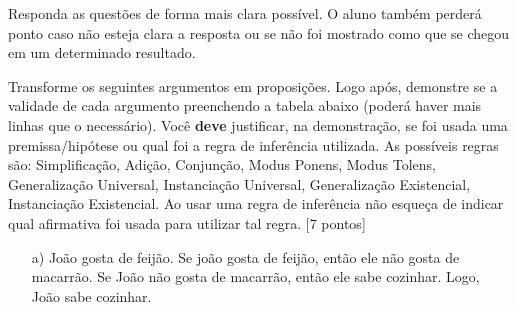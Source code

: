 \documentclass[16pt]{examdesign}
\begin{document}
\begin{fillin}[title={},
                    rearrange=no,resetcounter=no,suppressprefix]
\newpage
          Responda as questões de forma mais clara possível.
          O aluno também perderá ponto caso não esteja clara a resposta ou se não foi mostrado como que se chegou em um determinado resultado.
          
	\begin{question}


 	 Transforme os seguintes argumentos em proposições. Logo após, demonstre se a validade de cada argumento preenchendo a tabela abaixo (poderá haver mais linhas que o necessário). 
 	 Você \textbf{deve} justificar, na demonstração, se foi usada uma premissa/hipótese ou qual foi a regra de inferência utilizada. 
 	 As possíveis regras são: Simplificação, Adição, Conjunção, Modus Ponens, Modus Tolens, Generalização Universal, Instanciação Universal, Generalização Existencial, Instanciação Existencial.
 	 Ao usar uma regra de inferência não esqueça de indicar qual afirmativa foi usada para utilizar tal regra. [7 pontos]
  	 
	  \begin{itemize}
	   \item[a)] João gosta de feijão. Se joão gosta de feijão, então ele não gosta de macarrão. 
	   Se João não gosta de macarrão, então ele sabe cozinhar. Logo, João sabe cozinhar.
	   

\end{itemize}
\end{question}
\end{fillin}
\end{document}

